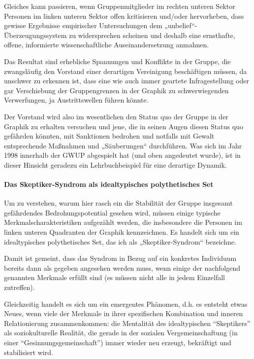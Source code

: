 Gleiches kann passieren, wenn Gruppenmitglieder im rechten unteren
Sektor Personen im linken unteren Sektor offen kritisieren und/oder
hervorheben, dass gewisse Ergebnisse empirischer Untersuchungen dem
„unbelief``-Überzeugungssystem zu widersprechen scheinen und deshalb
eine ernsthafte, offene, informierte wissenschaftliche
Auseinandersetzung anmahnen.

Das Resultat sind erhebliche Spannungen und Konflikte in der Gruppe, die
zwangsläufig den Vorstand einer derartigen Vereinigung beschäftigen
müssen, da unschwer zu erkennen ist, dass eine wie auch immer geartete
Infragestellung oder gar Verschiebung der Gruppengrenzen in der Graphik
zu schwerwiegenden Verwerfungen, ja Austrittswellen führen könnte.

Der Vorstand wird also im wesentlichen den Status quo der Gruppe in der
Graphik zu erhalten versuchen und jene, die in seinen Augen diesen
Status quo gefährden könnten, mit Sanktionen bedrohen und notfalls mit
Gewalt entsprechende Maßnahmen und „Säuberungen`` durchführen. Was sich
im Jahr 1998 innerhalb der GWUP abgespielt hat (und oben angedeutet
wurde), ist in dieser Hinsicht geradezu ein Lehrbuchbeispiel für eine
derartige Dynamik.

\hypertarget{das-skeptiker-syndrom-als-idealtypisches-polythetisches-set}{%
\paragraph{Das Skeptiker-Syndrom als idealtypisches polythetisches
Set}\label{das-skeptiker-syndrom-als-idealtypisches-polythetisches-set}}

Um zu verstehen, warum hier rasch ein die Stabilität der Gruppe
insgesamt gefährdendes Bedrohungspotential gesehen wird, müssen einige
typische Merkmalscharakteristiken aufgezählt werden, die insbesondere
die Personen im linken unteren Quadranten der Graphik kennzeichnen. Es
handelt sich um ein idealtypisches polythetisches Set, das ich als
„Skeptiker-Syndrom`` bezeichne.

Damit ist gemeint, dass das Syndrom in Bezug auf ein konkretes
Individuum bereits dann als gegeben angesehen werden muss, wenn einige
der nachfolgend genannten Merkmale erfüllt sind (es müssen nicht alle in
jedem Einzelfall zutreffen).

Gleichzeitig handelt es sich um ein emergentes Phänomen, d.h. es
entsteht etwas Neues, wenn viele der Merkmale in ihrer spezifischen
Kombination und inneren Relationierung zusammenkommen: die Mentalität
des idealtypischen ``Skeptikers'' als soziokulturelle Realität, die
gerade in der sozialen Vergemeinschaftung (in einer
``Gesinnungsgemeinschaft'') immer wieder neu erzeugt, bekräftigt und
stabilisiert wird.

